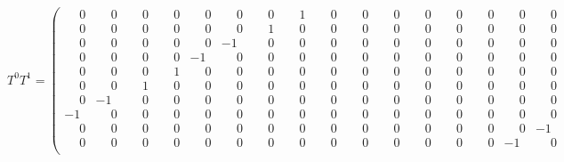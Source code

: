 \documentclass[10pt]{article}
\begin{document}
\[
T^{0}T^{1} = \left(\begin{smallmatrix}
\phantom{-}0 & \phantom{-}0 & \phantom{-}0 & \phantom{-}0 & \phantom{-}0 & \phantom{-}0 & \phantom{-}0 & \phantom{-}1 & \phantom{-}0 & \phantom{-}0 & \phantom{-}0 & \phantom{-}0 & \phantom{-}0 & \phantom{-}0 & \phantom{-}0 & \phantom{-}0 \\
\phantom{-}0 & \phantom{-}0 & \phantom{-}0 & \phantom{-}0 & \phantom{-}0 & \phantom{-}0 & \phantom{-}1 & \phantom{-}0 & \phantom{-}0 & \phantom{-}0 & \phantom{-}0 & \phantom{-}0 & \phantom{-}0 & \phantom{-}0 & \phantom{-}0 & \phantom{-}0 \\
\phantom{-}0 & \phantom{-}0 & \phantom{-}0 & \phantom{-}0 & \phantom{-}0 & -1 & \phantom{-}0 & \phantom{-}0 & \phantom{-}0 & \phantom{-}0 & \phantom{-}0 & \phantom{-}0 & \phantom{-}0 & \phantom{-}0 & \phantom{-}0 & \phantom{-}0 \\
\phantom{-}0 & \phantom{-}0 & \phantom{-}0 & \phantom{-}0 & -1 & \phantom{-}0 & \phantom{-}0 & \phantom{-}0 & \phantom{-}0 & \phantom{-}0 & \phantom{-}0 & \phantom{-}0 & \phantom{-}0 & \phantom{-}0 & \phantom{-}0 & \phantom{-}0 \\
\phantom{-}0 & \phantom{-}0 & \phantom{-}0 & \phantom{-}1 & \phantom{-}0 & \phantom{-}0 & \phantom{-}0 & \phantom{-}0 & \phantom{-}0 & \phantom{-}0 & \phantom{-}0 & \phantom{-}0 & \phantom{-}0 & \phantom{-}0 & \phantom{-}0 & \phantom{-}0 \\
\phantom{-}0 & \phantom{-}0 & \phantom{-}1 & \phantom{-}0 & \phantom{-}0 & \phantom{-}0 & \phantom{-}0 & \phantom{-}0 & \phantom{-}0 & \phantom{-}0 & \phantom{-}0 & \phantom{-}0 & \phantom{-}0 & \phantom{-}0 & \phantom{-}0 & \phantom{-}0 \\
\phantom{-}0 & -1 & \phantom{-}0 & \phantom{-}0 & \phantom{-}0 & \phantom{-}0 & \phantom{-}0 & \phantom{-}0 & \phantom{-}0 & \phantom{-}0 & \phantom{-}0 & \phantom{-}0 & \phantom{-}0 & \phantom{-}0 & \phantom{-}0 & \phantom{-}0 \\
-1 & \phantom{-}0 & \phantom{-}0 & \phantom{-}0 & \phantom{-}0 & \phantom{-}0 & \phantom{-}0 & \phantom{-}0 & \phantom{-}0 & \phantom{-}0 & \phantom{-}0 & \phantom{-}0 & \phantom{-}0 & \phantom{-}0 & \phantom{-}0 & \phantom{-}0 \\
\phantom{-}0 & \phantom{-}0 & \phantom{-}0 & \phantom{-}0 & \phantom{-}0 & \phantom{-}0 & \phantom{-}0 & \phantom{-}0 & \phantom{-}0 & \phantom{-}0 & \phantom{-}0 & \phantom{-}0 & \phantom{-}0 & \phantom{-}0 & \phantom{-}0 & -1 \\
\phantom{-}0 & \phantom{-}0 & \phantom{-}0 & \phantom{-}0 & \phantom{-}0 & \phantom{-}0 & \phantom{-}0 & \phantom{-}0 & \phantom{-}0 & \phantom{-}0 & \phantom{-}0 & \phantom{-}0 & \phantom{-}0 & \phantom{-}0 & -1 & \phantom{-}0 \\

\end{smallmatrix}\]
\end{document}
